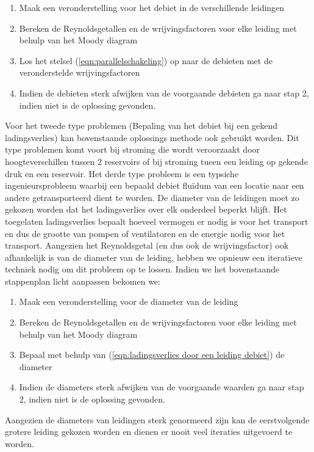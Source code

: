 \begin{enumerate}
	\item Maak een veronderstelling voor het debiet in de verschillende leidingen
	\item Bereken de Reynoldsgetallen en de wrijvingsfactoren voor elke leiding met behulp van het Moody diagram
	\item Los het stelsel (\ref{eqn:parallelschakeling}) op naar de debieten met de veronderstelde wrijvingsfactoren
	\item Indien de debieten sterk afwijken van de voorgaande debieten ga naar stap 2, indien niet is de oplossing gevonden.
\end{enumerate}
\npar
Voor het tweede type problemen (Bepaling van het debiet bij een gekend ladingsverlies) kan bovenstaande oplossings methode ook gebruikt worden. Dit type problemen komt voort bij stroming die wordt veroorzaakt door hoogteverschillen tussen 2 reservoirs of bij stroming tueen een leiding op gekende druk en een reservoir. 
\npar
Het derde type probleem is een typsiche ingenieursprobleem waarbij een bepaald debiet flu\"idum van een locatie naar een andere getransporteerd dient te worden. De diameter van de leidingen moet zo gekozen worden dat het ladingsverlies over elk onderdeel beperkt blijft. Het toegelaten ladingsverlies bepaalt hoeveel vermogen er nodig is voor het transport en dus de grootte van pompen of ventilatoren en de energie nodig voor het transport. Aangezien het Reynoldsgetal (en dus ook de wrijvingsfactor) ook afhankelijk is van de diameter van de leiding, hebben we opnieuw een iteratieve techniek nodig om dit probleem op te lossen. Indien we het bovenstaande stappenplan licht aanpassen bekomen we:
\begin{enumerate}
	\item Maak een veronderstelling voor de diameter van de leiding
	\item Bereken de Reynoldsgetallen en de wrijvingsfactoren voor elke leiding met behulp van het Moody diagram
	\item Bepaal met behulp van (\ref{eqn:ladingsverlies door een leiding debiet}) de diameter
	\item Indien de diameters sterk afwijken van de voorgaande waarden ga naar stap 2, indien niet is de oplossing gevonden.
\end{enumerate}
Aangezien de diameters van leidingen sterk genormeerd zijn kan de eerstvolgende grotere leiding gekozen worden en dienen er nooit veel iteraties uitgevoerd te worden.

